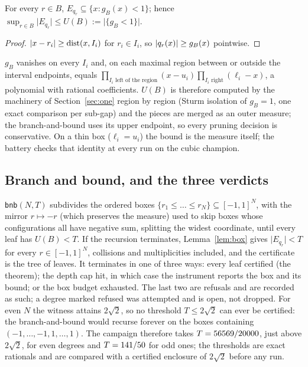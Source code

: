 \documentclass[11pt]{article}
\newcommand{\dist}{\operatorname{dist}}
\newcommand{\meas}[1]{\lvert #1 \rvert}
\begin{document}
\begin{lemma}\label{lem:box}
For every $r\in B$, $E_{q_r}\subseteq\{x:g_B(x)<1\}$; hence
$\sup_{r\in B}\meas{E_{q_r}}\le U(B):=\meas{\{g_B<1\}}$.
\end{lemma}

\begin{proof}
$\abs{x-r_i}\ge\dist(x,I_i)$ for $r_i\in I_i$, so $\lvert q_r(x) \rvert\ge g_B(x)$ pointwise.
\end{proof}

$g_B$ vanishes on every $I_i$ and, on each maximal region between or outside the interval
endpoints, equals $\prod_{I_i\text{ left of the region}}(x-u_i)\prod_{I_i\text{ right}}(\ell_i-x)$,
a polynomial with rational coefficients. $U(B)$ is therefore computed by the machinery of
Section~\ref{sec:one} region by region (Sturm isolation of $g_B=1$, one exact comparison per
sub-gap) and the pieces are merged as an outer measure; the branch-and-bound uses its upper
endpoint, so every pruning decision is conservative. On a thin box ($\ell_i=u_i$) the bound is
the measure itself; the battery checks that identity at every run on the cubic champion.

\subsection{Branch and bound, and the three verdicts}\label{sec:bnb}

\texttt{bnb}$(N,T)$ subdivides the ordered boxes $\{r_1\le\dots\le r_N\}\subseteq[-1,1]^N$,
with the mirror $r\mapsto-r$ (which preserves the measure) used to skip boxes whose
configurations all have negative sum, splitting the widest coordinate, until every leaf has
$U(B)<T$. If the recursion terminates, Lemma~\ref{lem:box} gives $\meas{E_{q_r}}<T$ for every
$r\in[-1,1]^N$, collisions and multiplicities included, and the certificate is the tree of
leaves. It terminates in one of three ways: every leaf certified (the theorem); the depth cap
hit, in which case the instrument reports the box and its bound; or the box budget exhausted.
The last two are refusals and are recorded as such; a degree marked refused was attempted and
is open, not dropped. For even $N$ the witness attains $2\sqrt2$, so no threshold
$T\le2\sqrt2$ can ever be certified: the branch-and-bound would recurse forever on the boxes
containing $(-1,\dots,-1,1,\dots,1)$. The campaign therefore takes $T=56569/20000$, just above
$2\sqrt2$, for even degrees and $T=141/50$ for odd ones; the thresholds are exact rationals
and are compared with a certified enclosure of $2\sqrt2$ before any run.
\end{document}
